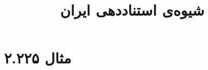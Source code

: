 \documentclass[a4paper,10pt]{article}
\begin{document}
\title{شیوه‌ی استناددهی ایران}
\author{}
\date{}
\maketitle



\section*{مثال ۲.۲۲۵}

\cite{پارس1385}\\
\cite{ایران1385}\\
\begin{latin}\noindent
\cite{britanica2002}\\
\cite{music2002}\\
\end{latin}






\end{document}
